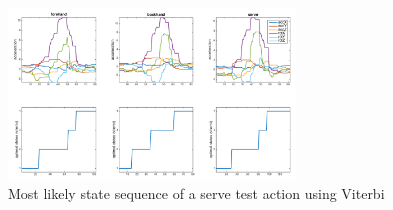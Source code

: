 \begin{figure}
\centering
\includegraphics[width=3in]{resources/viterbi.png}
\caption{Most likely state sequence of a serve test action using Viterbi}
\label{fig-viterbi}
\end{figure}